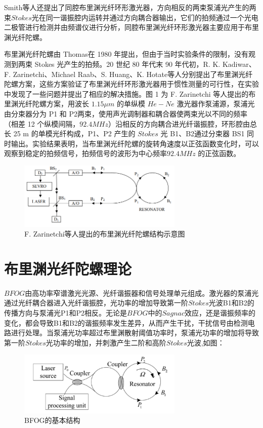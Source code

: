 \documentclass[UTF8]{ctexart}
\begin{document}
Smith等人还提出了同腔布里渊光纤环形激光器，方向相反的两束泵浦光产生的两束$Stokes$光在同一谐振腔内运转并通过方向耦合器输出，它们的拍频通过一个光电二极管进行检测并由频谱仪进行分析，同腔布里渊光纤环形激光器主要应用于布里渊光纤陀螺。


布里渊光纤陀螺由 Thomas在 1980 年提出，但由于当时实验条件的限制，没有观测到两束 Stokes 光产生的拍频。20 世纪 80 年代末 90 年代初，R. K. Kadiwar、F. Zarinetchi、Michael Raab、S. Huang、K. Hotate等人分别提出了布里渊光纤陀螺方案，这些方案验证了布里渊光纤环形激光器用于惯性测量的可行性，在实验中发现了一些问题并提出了相应的解决措施。图 1\cite{Luo2013BrillouinRamanCO} 为 F. Zarinetchi 等人提出的布里渊光纤陀螺方案，用波长 $1.15 \mu m$ 的单纵模 $He-Ne$ 激光器作泵浦源，泵浦光由分束器分为 P1 和 P2两束，使用声光调制器和耦合器使两束光以不同的频率（相差 12 个纵模间隔，$92.4 MHz$）沿相反的方向耦合进光纤谐振腔，环形腔由总长 25 m 的单模光纤构成，P1、P2 产生的 $Stokes$ 光 B1、B2通过分束器 BS1 同时输出。实验结果表明，当布里渊光纤陀螺的旋转角速度以正弦函数变化时，可以观察到稳定的拍频信号，拍频信号的波形为中心频率$ 92.4 MHz$ 的正弦函数。
\begin{figure}[htb]
	\begin{center}
		\includegraphics[width=0.7\textwidth]{1.png}
		\caption{F. Zarinetchi等人提出的布里渊光纤陀螺结构示意图}
	\end{center}
\end{figure}
\section{布里渊光纤陀螺理论}
$BFOG$由高功率窄谱激光光源、光纤谐振器和信号处理单元组成。激光器的泵浦光通过光纤耦合器进入光纤谐振腔，光功率的增加导致第一阶$Stokes$光波B1和B2的传播方向与泵浦光P1和P2相反。无论是$BFOG$中的$Sagnac$效应，还是谐振频率的变化，都会导致B1和B2的谐振频率发生差异，从而产生干扰，干扰信号由检测电路进行处理。当泵浦光功率超过布里渊散射阈值功率时，泵浦光功率的增加将导致第一阶$Stokes$光功率的增加，并刺激产生二阶和高阶$Stokes$光波,如图\cite{Lihui2015MathematicalMO}：
\begin{figure}[htb]
	\begin{center}
		\includegraphics[width=0.7\textwidth]{2.png}
		\caption{BFOG的基本结构}
	\end{center}
\end{figure}
\end{document}
